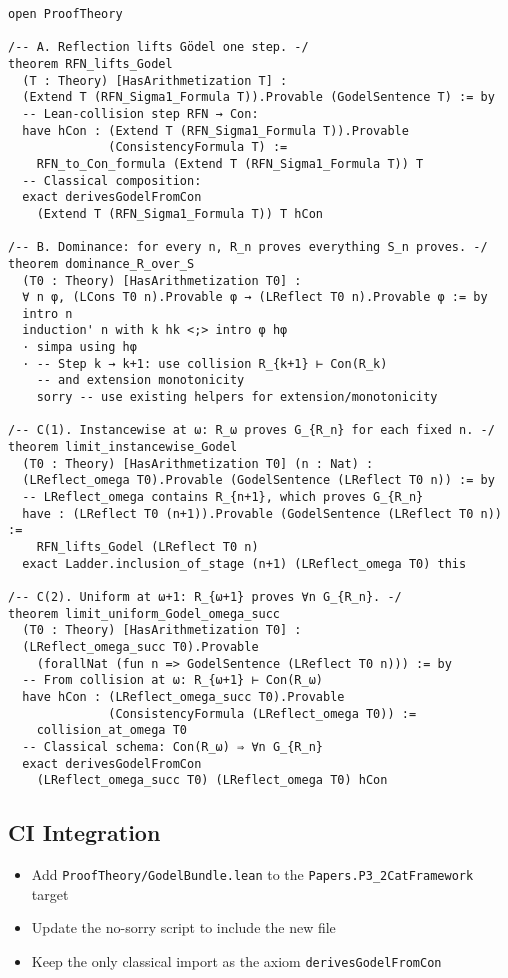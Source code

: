 \documentclass[11pt]{article}
\begin{document}
\begin{lstlisting}[language=Lean]
open ProofTheory

/-- A. Reflection lifts Gödel one step. -/
theorem RFN_lifts_Godel
  (T : Theory) [HasArithmetization T] :
  (Extend T (RFN_Sigma1_Formula T)).Provable (GodelSentence T) := by
  -- Lean-collision step RFN → Con:
  have hCon : (Extend T (RFN_Sigma1_Formula T)).Provable 
              (ConsistencyFormula T) :=
    RFN_to_Con_formula (Extend T (RFN_Sigma1_Formula T)) T
  -- Classical composition:
  exact derivesGodelFromCon 
    (Extend T (RFN_Sigma1_Formula T)) T hCon

/-- B. Dominance: for every n, R_n proves everything S_n proves. -/
theorem dominance_R_over_S
  (T0 : Theory) [HasArithmetization T0] :
  ∀ n φ, (LCons T0 n).Provable φ → (LReflect T0 n).Provable φ := by
  intro n
  induction' n with k hk <;> intro φ hφ
  · simpa using hφ
  · -- Step k → k+1: use collision R_{k+1} ⊢ Con(R_k) 
    -- and extension monotonicity
    sorry -- use existing helpers for extension/monotonicity

/-- C(1). Instancewise at ω: R_ω proves G_{R_n} for each fixed n. -/
theorem limit_instancewise_Godel
  (T0 : Theory) [HasArithmetization T0] (n : Nat) :
  (LReflect_omega T0).Provable (GodelSentence (LReflect T0 n)) := by
  -- LReflect_omega contains R_{n+1}, which proves G_{R_n} 
  have : (LReflect T0 (n+1)).Provable (GodelSentence (LReflect T0 n)) :=
    RFN_lifts_Godel (LReflect T0 n)
  exact Ladder.inclusion_of_stage (n+1) (LReflect_omega T0) this

/-- C(2). Uniform at ω+1: R_{ω+1} proves ∀n G_{R_n}. -/
theorem limit_uniform_Godel_omega_succ
  (T0 : Theory) [HasArithmetization T0] :
  (LReflect_omega_succ T0).Provable
    (forallNat (fun n => GodelSentence (LReflect T0 n))) := by
  -- From collision at ω: R_{ω+1} ⊢ Con(R_ω)
  have hCon : (LReflect_omega_succ T0).Provable 
              (ConsistencyFormula (LReflect_omega T0)) :=
    collision_at_omega T0
  -- Classical schema: Con(R_ω) ⇒ ∀n G_{R_n}
  exact derivesGodelFromCon
    (LReflect_omega_succ T0) (LReflect_omega T0) hCon
\end{lstlisting}

\subsection{CI Integration}

\begin{itemize}
\item Add \texttt{ProofTheory/GodelBundle.lean} to the \texttt{Papers.P3\_2CatFramework} target
\item Update the no-sorry script to include the new file
\item Keep the only classical import as the axiom \texttt{derivesGodelFromCon}
\end{itemize}
\end{document}
